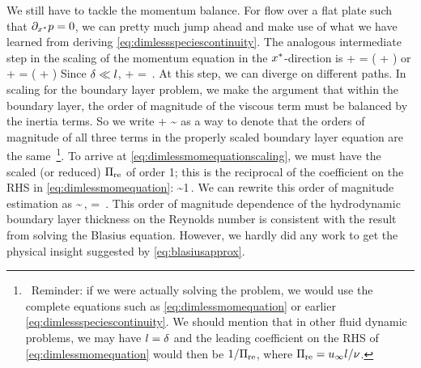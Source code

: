 We still have to tackle the momentum balance. For flow over a flat plate such that $\partial_{x^*}p = 0$, we can pretty much jump ahead and make use of what we have learned from deriving \cref{eq:dimlessspeciescontinuity}. The analogous intermediate step in the scaling of the momentum equation in the $x^*$-direction is
\beq
\dfrac{\fsvel}{\length}\ndvelx\xpd\ndvelx\ndposx + 
\dfrac{\fsvel}{\blthck}\dfrac{\blthck}{\length}\xpd\ndvelx\ndposy =
\kvisc
\left(
\ndvelx\ndposx +
\ndvelx\ndposy
\right)
\eeq
or
\beq
\ndvelx\xpd\ndvelx\ndposx + 
\dfrac{\blthck}{\length}\xpd\ndvelx\ndposy =
\left(
\ndvelx\ndposx +
\ndvelx\ndposy
\right)
\eeq
Since $\delta\ll l$,
\bneq\label{eq:dimlessmomequation}
\ndvelx\xpd\ndvelx\ndposx + 
\dfrac{\blthck}{\length}\xpd\ndvelx\ndposy =
\ndvelx\ndposy\,.
\eneq
At this step, we can diverge on different paths. In scaling for the boundary layer problem, we make the argument that within the boundary layer, the order of magnitude of the viscous term must be balanced by the inertia terms. So we write
\bneq\label{eq:dimlessmomequationscaling}
\ndvelx\xpd\ndvelx\ndposx +  \dfrac{\blthck}{\length}\xpd\ndvelx\ndposy \sim {}\ndvelx\ndposy
\eneq
as a way to denote that the orders of magnitude of all three terms in the properly scaled boundary layer equation are the same~\footnote{~Reminder: if we were actually solving the problem, we would use the complete equations such as \cref{eq:dimlessmomequation} or earlier \cref{eq:dimlessspeciescontinuity}. We should mention that in other fluid dynamic problems, we may have $l = \delta$ and the leading coefficient on the RHS of \cref{eq:dimlessmomequation} would then be $1/\Pi_\text{re}$, where $\Pi_\text{re} = u_{\infty}l/\nu$.}. To arrive at \cref{eq:dimlessmomequationscaling}, we must have the scaled (or reduced) $\Pi_\text{re}$ of order 1; this is the reciprocal of the coefficient on the RHS in \cref{eq:dimlessmomequation}:
\beq
{} \sim 1\,.
\eeq
We can rewrite this order of magnitude estimation as
\bneq\label{eq:blasiusapprox}
\dfrac{\blthck}{\length}\sim{}\,,\quad{}\quad
\kreynolds = \dfrac{\fsvel\length}{\kvisc}\,.
\eneq
This order of magnitude dependence of the hydrodynamic boundary layer thickness on the Reynolds number is consistent with the result from solving the Blasius equation. However, we hardly did any work to get the physical insight suggested by \cref{eq:blasiusapprox}.

